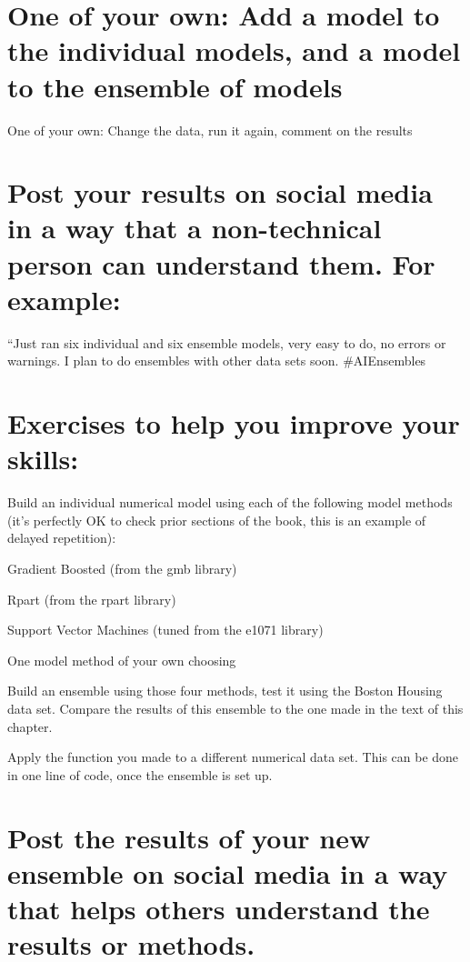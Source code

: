 \documentclass[
]{book}
\begin{document}
\section{One of your own: Add a model to the individual models, and a model to the ensemble of models}\label{one-of-your-own-add-a-model-to-the-individual-models-and-a-model-to-the-ensemble-of-models}

One of your own: Change the data, run it again, comment on the results

\section{Post your results on social media in a way that a non-technical person can understand them. For example:}\label{post-your-results-on-social-media-in-a-way-that-a-non-technical-person-can-understand-them.-for-example}

``Just ran six individual and six ensemble models, very easy to do, no
errors or warnings. I plan to do ensembles with other data sets soon.
\#AIEnsembles

\section{Exercises to help you improve your skills:}\label{exercises-to-help-you-improve-your-skills}

Build an individual numerical model using each of the following model
methods (it's perfectly OK to check prior sections of the book, this is
an example of delayed repetition):

Gradient Boosted (from the gmb library)

Rpart (from the rpart library)

Support Vector Machines (tuned from the e1071 library)

One model method of your own choosing

Build an ensemble using those four methods, test it using the Boston
Housing data set. Compare the results of this ensemble to the one made
in the text of this chapter.

Apply the function you made to a different numerical data set. This can
be done in one line of code, once the ensemble is set up.

\section{Post the results of your new ensemble on social media in a way that helps others understand the results or methods.}\label{post-the-results-of-your-new-ensemble-on-social-media-in-a-way-that-helps-others-understand-the-results-or-methods.}
\end{document}

